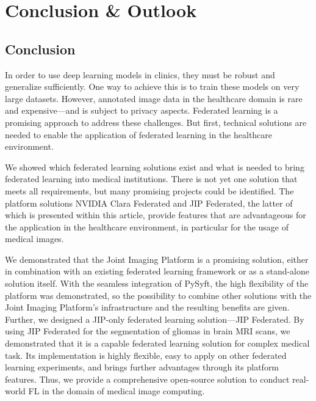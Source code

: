 \section{Conclusion \& Outlook}
\label{sec:ConclusionOutlook}

\subsection{Conclusion}
\label{subsec:Conclusion}
In order to use deep learning models in clinics, they must be robust and generalize sufficiently. One way to achieve this is to train these models on very large datasets. However, annotated image data in the healthcare domain is rare and expensive---and is subject to privacy aspects.
Federated learning is a promising approach to address these challenges.
But first, technical solutions are needed to enable the application of federated learning in the healthcare environment.


We showed which federated learning solutions exist and what is needed to bring federated learning into medical institutions. There is not yet one solution that meets all requirements, but many promising projects could be identified.
The platform solutions NVIDIA Clara Federated and JIP Federated, the latter of which is presented within this article, provide features that are advantageous for the application in the healthcare environment, in particular for the usage of medical images.

We demonstrated that the Joint Imaging Platform is a promising solution, either in combination with an existing federated learning framework or as a stand-alone solution itself.
With the seamless integration of PySyft, the high flexibility of the platform was demonstrated, so the possibility to combine other solutions with the Joint Imaging Platform's infrastructure and the resulting benefits are given.
Further, we designed a JIP-only federated learning solution---JIP Federated.
By using JIP Federated for the segmentation of gliomas in brain MRI scans, we demonstrated that it is a capable federated learning solution for complex medical task. Its implementation is highly flexible, easy to apply on other federated learning experiments, and brings further advantages through its platform features.
Thus, we provide a comprehensive open-source solution to conduct real-world FL in the domain of medical image computing.

